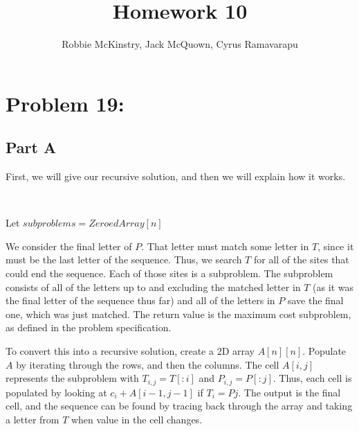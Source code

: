 \documentclass[12pt]{article}
\begin{document}
\title{Homework 10}
\author{Robbie McKinstry, Jack McQuown, Cyrus Ramavarapu}
\renewcommand{\today}{26 September 2016}
\renewcommand{\baselinestretch}{1.5}
\maketitle

\section*{Problem 19: }

\subsection{Part A}

First, we will give our recursive solution, and then we will explain how it works. 

\begin{algorithm}[H]
 \\


Let $subproblems = ZeroedArray[n]$

\end{algorithm}

We consider the final letter of $P$. That letter must match some letter in $T$, since it must be the last letter of the sequence. Thus, we search $T$ for all of the sites that could end the sequence. Each of those sites is a subproblem. The subproblem consists of all of the letters up to and excluding the matched letter in $T$ (as it was the final letter of the sequence thus far) and all of the letters in $P$ save the final one, which was just matched. The return value is the maximum cost subproblem, as defined in the problem specification.

To convert this into a recursive solution, create a 2D array $A[n][n]$. Populate $A$ by iterating through the rows, and then the columns. The cell $A[i, j]$ represents the subproblem with $T_{i, j} = T[:i]$ and $P_{i, j} = P[:j]$. Thus, each cell is populated by looking at $c_{i} + A[i-1, j-1]$ if $T_{i} = P{j}$. The output is the final cell, and the sequence can be found by tracing back through the array and taking a letter from $T$ when value in the cell changes.
\end{document}
